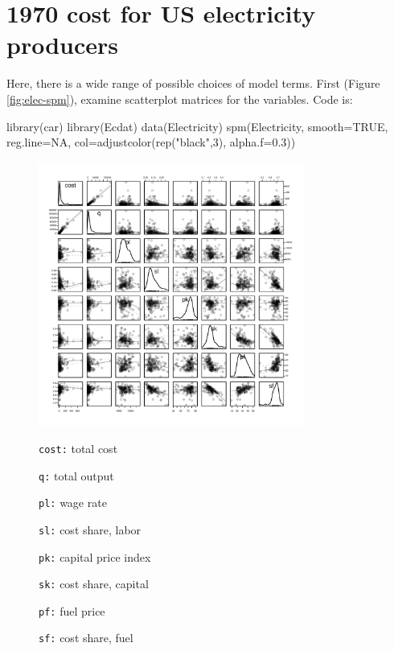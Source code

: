 \documentclass{tufte-book}\usepackage[]{graphicx}\usepackage[]{color}
\begin{document}
\section{1970 cost for US electricity producers}\label{ss:elec}

Here, there is a wide range of possible choices of model terms.  First
(Figure \ref{fig:elec-spm}), examine scatterplot matrices for the
variables. Code is:
\begin{Schunk}
\begin{Sinput}
library(car)
library(Ecdat)
data(Electricity)
spm(Electricity, smooth=TRUE, reg.line=NA,
    col=adjustcolor(rep("black",3), alpha.f=0.3))
\end{Sinput}
\end{Schunk}

\begin{figure}[h]
\vspace*{-18pt}
\parbox[c]{0.7\textwidth}{
\begin{Schunk}


\centerline{\includegraphics[width=0.775\textwidth]{figs/11-Elec-spm-1} }

\end{Schunk}
}
\hspace*{0.05\textwidth}
\parbox[c]{0.23\linewidth}{
\small
\begin{list}{}{\leftmargin=2em \setlength{\itemsep}{5pt} \setlength{\parsep}{1pt}}
\setlength{\labelwidth}{3em}
\item[\texttt{cost:}]
 total cost
\item[\texttt{q:}]
 total output
\item[\texttt{pl:}]
 wage rate
\item[\texttt{sl:}]
 cost share, labor
\item[\texttt{pk:}]
 capital price index
\item[\texttt{sk:}]
 cost share,
 capital
\item[\texttt{pf:}]
 fuel price
\item[\texttt{sf:}]
 cost share, fuel
\end{list}
}
\vspace*{-9pt}


\end{figure}
\end{document}
